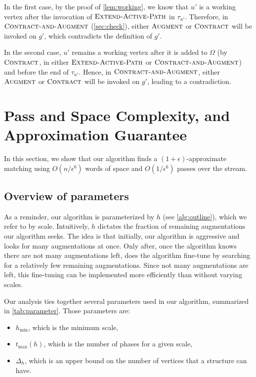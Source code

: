 \documentclass{article}
\newcommand{\eps}{\epsilon}
\newcommand{\Omg}{\Omega}
\newcommand{\tmax}{t_{\max}}
\newcommand{\hmin}{h_{\min}}
\newcommand{\algExtend}{\textsc{Extend-Active-Path}\xspace}
\newcommand{\algAugment}{\textsc{Augment}\xspace}
\newcommand{\algContract}{\textsc{Contract}\xspace}
\newcommand{\algCheck}{\textsc{Contract-and-Augment}\xspace}
\begin{document}
In the first case, by the proof of \cref{lem:working}, we know that $u'$ is a working vertex after the invocation of $\algExtend$ in $\tau_{u'}$. Therefore, in $\algCheck$ (\cref{sec:check}), either $\algAugment$ or $\algContract$ will be invoked on $g'$, which contradicts the definition of $g'$. 

In the second case, $u'$ remains a working vertex after it is added to $\Omg$ (by $\algContract$, in either $\algExtend$ or $\algCheck$) and before the end of $\tau_{u'}$. Hence, in $\algCheck$, either $\algAugment$ or $\algContract$ will be invoked on $g'$, leading to a contradiction.



\section{Pass and Space Complexity, and Approximation Guarantee}
\label{sec:pass-complexity}
In this section, we show that our algorithm finds a $(1 + \eps)$-approximate matching using $O(n/\eps^6)$ words of space and $O(1/\eps^6)$ passes over the stream.

\subsection{Overview of parameters} \label{sec:overview-analysis}
As a reminder, our algorithm is parameterized by $h$ (see \cref{alg:outline}), which we refer to by scale. Intuitively, $h$ dictates the fraction of remaining augmentations our algorithm seeks. The idea is that initially, our algorithm is aggressive and looks for many augmentations at once. 
Only after, once the algorithm knows there are not many augmentations left, does the algorithm fine-tune by searching for a relatively few remaining augmentations. 
Since not many augmentations are left, this fine-tuning can be implemented more efficiently than without varying scales.

Our analysis ties together several parameters used in our algorithm, summarized in \cref{tab:parameter}.
Those parameters are:
\begin{itemize}
    \item $\hmin$, which is the minimum scale,
    \item $\tmax(h)$, which is the number of phases for a given scale,
    \item $\Delta_h$, which is an upper bound on the number of vertices that a structure can have.
\end{itemize}
\end{document}

